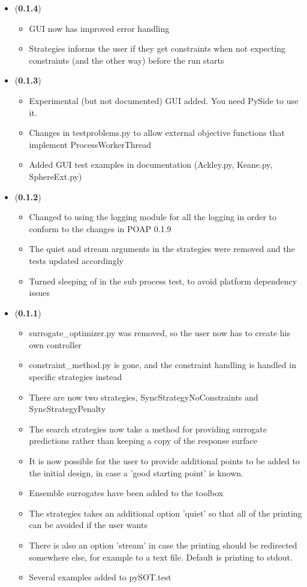 \documentclass[]{article}
\begin{document}
\begin{itemize}
	\item (\textbf{0.1.4}) 
	\begin{itemize}
		\item GUI now has improved error handling 
		\item Strategies informs the user if they get constraints when not expecting constraints 
		(and the other way) before the run starts
	\end{itemize}

	\item (\textbf{0.1.3}) 
	\begin{itemize}
		\item Experimental (but not documented) GUI added. You need PySide to use it.
		\item Changes in testproblems.py to allow external objective functions that implement 
		ProcessWorkerThread
		\item Added GUI test examples in documentation (Ackley.py, Keane.py, SphereExt.py)
	\end{itemize}

	\item (\textbf{0.1.2})
	\begin{itemize}
		\item 	Changed to using the logging module for all the logging in order to conform to the 
		changes in POAP 0.1.9
		\item The quiet and stream arguments in the strategies were removed and the tests 
		updated accordingly
		\item Turned sleeping of in the sub process test, to avoid platform dependency issues
	\end{itemize}

	\item (\textbf{0.1.1})
	\begin{itemize}
		\item surrogate\_optimizer.py was removed, so the user now has to create his own controller
		\item constraint\_method.py is gone, and the constraint handling is handled in specific 
		strategies instead
		\item 	There are now two strategies, SyncStrategyNoConstraints and SyncStrategyPenalty
		\item The search strategies now take a method for providing surrogate predictions rather 
		than keeping a copy of the response surface
		\item It is now possible for the user to provide additional points to be added to the initial 
		design, in case a 'good starting point' is known.
		\item Ensemble surrogates have been added to the toolbox
		\item 	The strategies takes an additional option 'quiet' so that all of the printing can be 
		avoided if the user wants
		\item There is also an option 'stream' in case the printing should be redirected somewhere 
		else, for example to a text file. Default is printing to stdout.
		\item 	Several examples added to pySOT.test
	\end{itemize}
	

\end{itemize}
\end{document}
